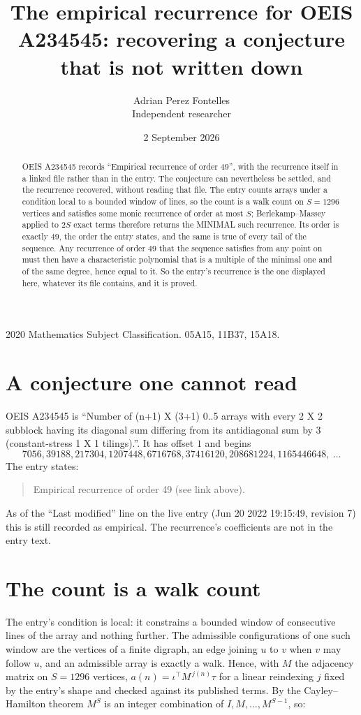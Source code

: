 \documentclass[11pt,a4paper]{article}
\title{The empirical recurrence for OEIS A234545: recovering a conjecture that is not written down}
\author{Adrian Perez Fontelles\\ \small Independent researcher}
\date{2 September 2026}
\theoremstyle{plain}
\theoremstyle{definition}
\begin{document}
\maketitle

\begin{abstract}
OEIS A234545 records ``Empirical recurrence of order $49$'', with the recurrence itself in a
linked file rather than in the entry. The conjecture can nevertheless be settled, and the
recurrence recovered, without reading that file. The entry counts arrays under a condition
local to a bounded window of lines, so the count is a walk count on $S=1296$ vertices and
satisfies some monic recurrence of order at most $S$; Berlekamp--Massey applied to $2S$ exact
terms therefore returns the MINIMAL such recurrence. Its order is exactly $49$, the order
the entry states, and the same is true of every tail of the sequence. Any recurrence of order
$49$ that the sequence satisfies from any point on must then have a characteristic
polynomial that is a multiple of the minimal one and of the same degree, hence equal to it. So
the entry's recurrence is the one displayed here, whatever its file contains, and it is
proved.
\end{abstract}

\noindent\small 2020 Mathematics Subject Classification. 05A15, 11B37, 15A18.\normalsize

\section{A conjecture one cannot read}

OEIS A234545 is ``Number of (n+1) X (3+1) 0..5 arrays with every 2 X 2 subblock having its diagonal sum differing from its antidiagonal sum by 3 (constant-stress 1 X 1 tilings).''. It has offset $1$ and begins
\[
7056, 39188, 217304, 1207448, 6716768, 37416120, 208681224, 1165446648,\ \dots
\]
The entry states:
\begin{quote}
Empirical recurrence of order 49 (see link above).
\end{quote}
As of the ``Last modified'' line on the live entry (Jun 20 2022 19:15:49, revision 7) this is still
recorded as empirical. The recurrence's coefficients are not in the entry text.

\section{The count is a walk count}

The entry's condition is local: it constrains a bounded window of consecutive lines of the
array and nothing further. The admissible configurations of one such window are the vertices
of a finite digraph, an edge joining $u$ to $v$ when $v$ may follow $u$, and an admissible
array is exactly a walk. Hence, with $M$ the adjacency matrix on $S=1296$ vertices,
$a(n)=\iota^{\!\top}M^{\,j(n)}\tau$ for a linear reindexing $j$ fixed by the entry's shape
and checked against its published terms. By the Cayley--Hamilton theorem $M^{S}$ is an
integer combination of $I,M,\dots,M^{S-1}$, so:
\end{document}
